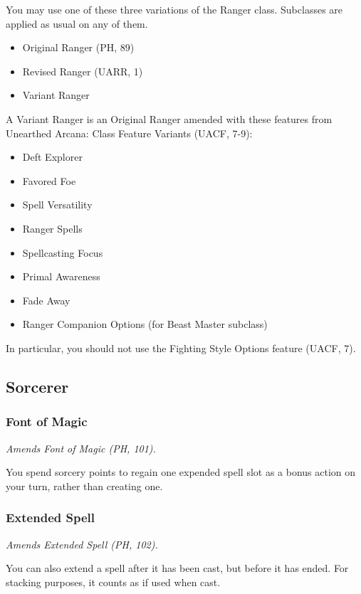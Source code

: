 \documentclass[letterpaper,twocolumn,openany,nodeprecatedcode]{dndbook}
\begin{document}
You may use one of these three variations of the Ranger class. Subclasses are applied as usual on any of them.

\begin{itemize}
    \item Original Ranger (PH, 89)
    \item Revised Ranger (UARR, 1)
    \item Variant Ranger
\end{itemize}

\label{balance-class-ranger-variant}
A Variant Ranger is an Original Ranger amended with these features from Unearthed Arcana: Class Feature Variants (UACF, 7-9):

\begin{itemize}
    \item Deft Explorer
    \item Favored Foe
    \item Spell Versatility
    \item Ranger Spells
    \item Spellcasting Focus
    \item Primal Awareness
    \item Fade Away
    \item Ranger Companion Options (for Beast Master subclass)
\end{itemize}

In particular, you should not use the Fighting Style Options feature (UACF, 7).


\subsection{Sorcerer}

\subsubsection{Font of Magic}
\textit{Amends Font of Magic (PH, 101).}

You spend sorcery points to regain one expended spell slot as a bonus action on your turn, rather than creating one.

\subsubsection{Extended Spell}
\textit{Amends Extended Spell (PH, 102).}

You can also extend a spell after it has been cast, but before it has ended. For stacking purposes, it counts as if used when cast.
\end{document}
